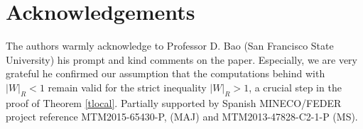 \documentclass[reqno,10pt]{amsart}
\begin{document}
\section*{Acknowledgements}

The authors warmly acknowledge  to Professor D. Bao (San Francisco State University) his prompt and kind comments on the paper. Especially, we are very grateful  he confirmed our assumption that the computations behind \cite{BR, BRS} with $|W|_R<1$ remain valid
for the strict inequality $|W|_R>1$,    
a crucial step  in the proof of Theorem \ref{tlocal}.   Partially
supported by Spanish  MINECO/FEDER project reference
MTM2015-65430-P,  (MAJ) and MTM2013-47828-C2-1-P (MS). 
\end{document}
